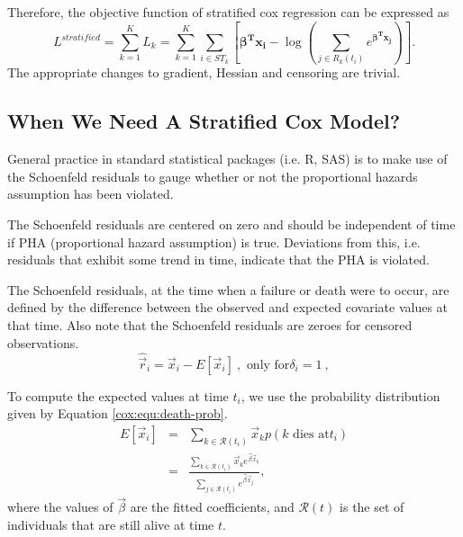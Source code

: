 Therefore, the objective function of stratified cox regression can be expressed as
\begin{equation}\label{cox:equ:stratified-obj}
L^{\mathit{stratified}} = \sum_{k=1}^{K} L_{k} = \sum_{k=1}^{K} \sum_{i \in \mathit{ST}_{k}} \left[  \mathbf{\beta^T x_i} - \log\left(\sum_{j \in R_k(t_i)} e^{\mathbf{\beta^T x_j} } \right) \right].
\end{equation}
The appropriate changes to gradient, Hessian and censoring are trivial.

\subsection{When We Need A Stratified Cox Model?}\label{cox:diagnostic}
General practice in standard statistical packages (i.e. R, SAS) is to
make use of the Schoenfeld residuals to gauge whether or not the
proportional hazards assumption has been violated.


The Schoenfeld residuals are centered on zero and should be
independent of time if PHA (proportional hazard assumption) is
true. Deviations from this, i.e. residuals that exhibit some trend in
time, indicate that the PHA is violated.

The Schoenfeld residuals, at the time when a failure or death were to occur, are
defined by the difference between the observed and expected covariate values at
that time. Also note that the Schoenfeld residuals are zeroes for censored
observations.
\begin{equation}
\hat{\vec{r}}_i = \vec{x}_i - E[\vec{x}_i]\ ,\mbox{ only for
}\delta_i=1\ ,
\end{equation}

To compute the expected values at time $t_{i}$, we use the probability distribution given by Equation \ref{cox:equ:death-prob}.
\begin{eqnarray}
E[\vec{x}_i] &=& \sum_{k\in \mathcal{R}(t_i)}\vec{x}_k p(k\mbox{ dies at
}t_i) \nonumber\\
&=& \frac{\sum_{k\in \mathcal{R}(t_i)}\vec{x}_k
  e^{\vec{\beta}\vec{x}_k}}{\sum_{j\in
    \mathcal{R}(t_i)}e^{\vec{\beta}\vec{x}_j} },
\end{eqnarray}
where the values of $\vec{\beta}$ are the fitted coefficients, and $\mathcal{R}(t)$ is the set of individuals that are still alive at time $t$.

